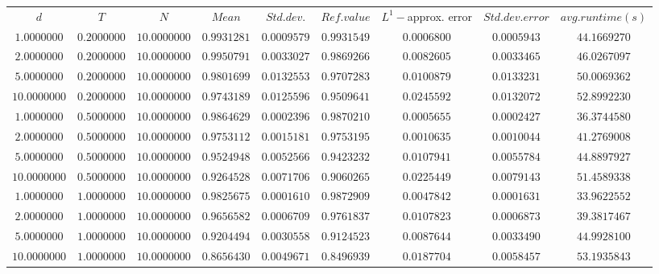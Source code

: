 \begin{tabular}{ccccccccc}
$d$ & $T$ & $N$ & $Mean$ & $Std. dev.$ & $Ref. value$ & $L^1-$approx. error & $Std. dev. error$ & $avg. runtime (s)$\\
$1.0000000$ & $0.2000000$ & $10.0000000$ & $0.9931281$ & $0.0009579$ & $0.9931549$ & $0.0006800$ & $0.0005943$ & $44.1669270$\\
$2.0000000$ & $0.2000000$ & $10.0000000$ & $0.9950791$ & $0.0033027$ & $0.9869266$ & $0.0082605$ & $0.0033465$ & $46.0267097$\\
$5.0000000$ & $0.2000000$ & $10.0000000$ & $0.9801699$ & $0.0132553$ & $0.9707283$ & $0.0100879$ & $0.0133231$ & $50.0069362$\\
$10.0000000$ & $0.2000000$ & $10.0000000$ & $0.9743189$ & $0.0125596$ & $0.9509641$ & $0.0245592$ & $0.0132072$ & $52.8992230$\\
$1.0000000$ & $0.5000000$ & $10.0000000$ & $0.9864629$ & $0.0002396$ & $0.9870210$ & $0.0005655$ & $0.0002427$ & $36.3744580$\\
$2.0000000$ & $0.5000000$ & $10.0000000$ & $0.9753112$ & $0.0015181$ & $0.9753195$ & $0.0010635$ & $0.0010044$ & $41.2769008$\\
$5.0000000$ & $0.5000000$ & $10.0000000$ & $0.9524948$ & $0.0052566$ & $0.9423232$ & $0.0107941$ & $0.0055784$ & $44.8897927$\\
$10.0000000$ & $0.5000000$ & $10.0000000$ & $0.9264528$ & $0.0071706$ & $0.9060265$ & $0.0225449$ & $0.0079143$ & $51.4589338$\\
$1.0000000$ & $1.0000000$ & $10.0000000$ & $0.9825675$ & $0.0001610$ & $0.9872909$ & $0.0047842$ & $0.0001631$ & $33.9622552$\\
$2.0000000$ & $1.0000000$ & $10.0000000$ & $0.9656582$ & $0.0006709$ & $0.9761837$ & $0.0107823$ & $0.0006873$ & $39.3817467$\\
$5.0000000$ & $1.0000000$ & $10.0000000$ & $0.9204494$ & $0.0030558$ & $0.9124523$ & $0.0087644$ & $0.0033490$ & $44.9928100$\\
$10.0000000$ & $1.0000000$ & $10.0000000$ & $0.8656430$ & $0.0049671$ & $0.8496939$ & $0.0187704$ & $0.0058457$ & $53.1935843$\\
\end{tabular}
